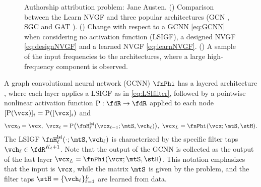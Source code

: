 

\begin{figure*}
    \centering
    \hfill
    \hfill
    \caption{Authorship attribution problem: Jane Austen. (\protect{}) Comparison between the Learn NVGF and three popular architectures (GCN \cite{Kipf2017-GCN}, SGC \cite{Weinberger2019-SGC} and GAT \cite{Velickovic2018-GAT}). (\protect{}) Change with respect to a GCNN \eqref{eq:GCNN} when considering no activation function (LSIGF), a designed NVGF \eqref{eq:designNVGF} and a learned NVGF \eqref{eq:learnNVGF}. (\protect{}) A sample of the input frequencies to the architectures, where a large high-frequency component is observed.}
    \label{fig:austen:results}
\end{figure*}

A graph convolutional neural network (GCNN) $\fnPhi$ has a layered architecture \cite{Defferrard2016-ChebNets, Gama2019-Archit}, where each layer applies a LSIGF as in \eqref{eq:LSIfilter}, followed by a pointwise nonlinear activation function $\rho:\fdR \to \fdR$ applied to each node $[\rho(\vcx)]_{i} = \rho([\vcx]_{i})$ and
\begin{equation} \label{eq:GCNN}
    \vcx_{0} = \vcx, \ \vcx_{\ell} = \rho \big( \fnH_{\ell}^{\text{lsi}} (\vcx_{\ell-1} ; \mtS, \vch_{\ell}) \big), \ \vcx_{L} = \fnPhi(\vcx;\mtS,\stH).
\end{equation}
%
The LSIGF $\fnH_{\ell}^{\text{lsi}}(\cdot;\mtS,\vch_{\ell})$ is characterized by the specific filter taps $\vch_{\ell} \in \fdR^{K_{\ell}+1}$. Note that the output of the GCNN is collected as the output of the last layer $\vcx_{L} = \fnPhi(\vcx;\mtS,\stH)$. This notation emphasizes that the input is $\vcx$, while the matrix $\mtS$ is given by the problem, and the filter taps $\stH = \{\vch_{\ell}\}_{\ell=1}^L$ are learned from data.

